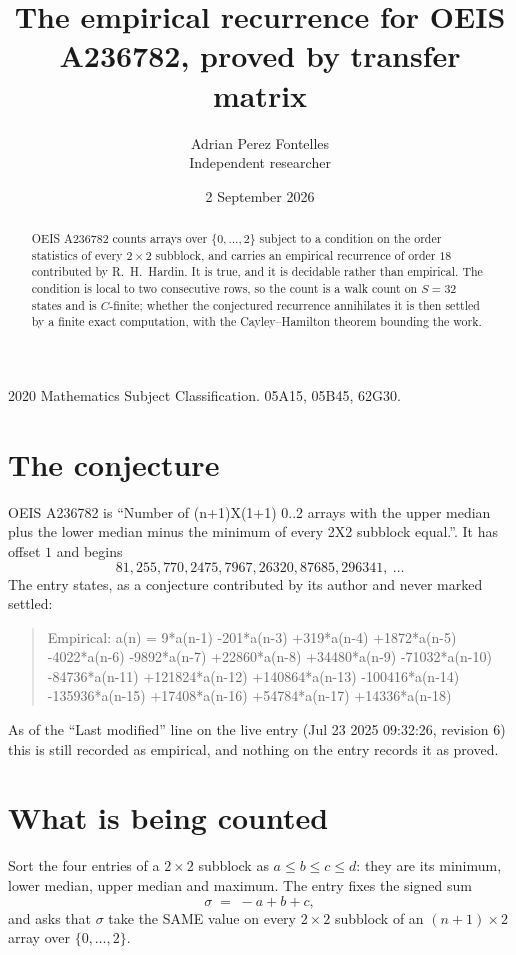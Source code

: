 \documentclass[11pt,a4paper]{article}
\title{The empirical recurrence for OEIS A236782, proved by transfer matrix}
\author{Adrian Perez Fontelles\\ \small Independent researcher}
\date{2 September 2026}
\theoremstyle{plain}
\theoremstyle{definition}
\begin{document}
\maketitle

\begin{abstract}
OEIS A236782 counts arrays over $\{0,\dots,2\}$ subject to a condition on the order
statistics of every $2\times2$ subblock, and carries an empirical recurrence of order
$18$ contributed by R.~H.~Hardin. It is true, and it is decidable rather than empirical.
The condition is local to two consecutive rows, so the count is a walk count on $S=32$
states and is $C$-finite; whether the conjectured recurrence annihilates it is then settled by
a finite exact computation, with the Cayley--Hamilton theorem bounding the work.
\end{abstract}

\noindent\small 2020 Mathematics Subject Classification. 05A15, 05B45, 62G30.\normalsize

\section{The conjecture}

OEIS A236782 is ``Number of (n+1)X(1+1) 0..2 arrays with the upper median plus the lower median minus the minimum of every 2X2 subblock equal.''. It has offset $1$ and begins
\[
81, 255, 770, 2475, 7967, 26320, 87685, 296341,\ \dots
\]
The entry states, as a conjecture contributed by its author and never marked settled:
\begin{quote}
Empirical: a(n) = 9*a(n-1) -201*a(n-3) +319*a(n-4) +1872*a(n-5) -4022*a(n-6) -9892*a(n-7) +22860*a(n-8) +34480*a(n-9) -71032*a(n-10) -84736*a(n-11) +121824*a(n-12) +140864*a(n-13) -100416*a(n-14) -135936*a(n-15) +17408*a(n-16) +54784*a(n-17) +14336*a(n-18)
\end{quote}
As of the ``Last modified'' line on the live entry (Jul 23 2025 09:32:26, revision 6) this is still
recorded as empirical, and nothing on the entry records it as proved.

\section{What is being counted}

Sort the four entries of a $2\times2$ subblock as $a\le b\le c\le d$: they
are its minimum, lower median, upper median and maximum. The entry fixes the signed sum
\[
\sigma\;=\;-a+b+c,
\]
and asks that $\sigma$ take the SAME value on every $2\times2$ subblock of an
$(n+1)\times2$ array over $\{0,\dots,2\}$.
\end{document}
